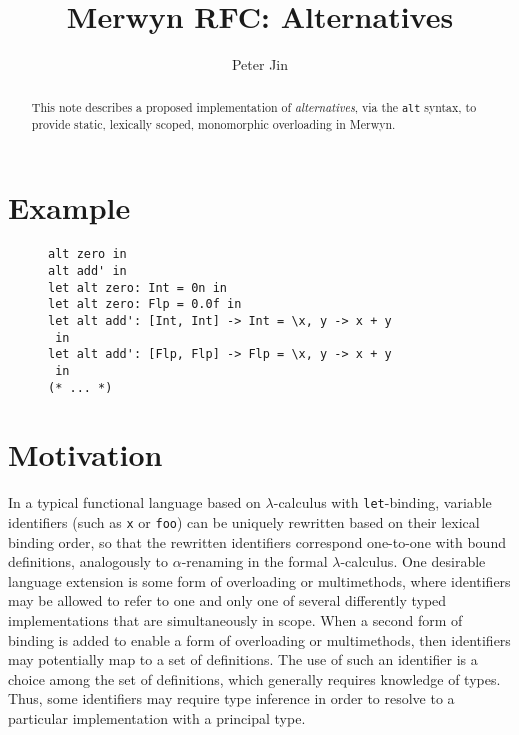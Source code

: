 \documentclass{article}
\title{Merwyn RFC: Alternatives}
\author{Peter Jin}
\renewcommand{\=}{\triangleq}
\begin{document}
\maketitle

\begin{abstract}
This note describes a proposed implementation of \emph{alternatives},
via the \texttt{alt} syntax, to provide static, lexically scoped, monomorphic
overloading in Merwyn.
\end{abstract}

\section{Example}

\begin{figure}[h]
\centering
\begin{varwidth}{\linewidth}
\begin{verbatim}
alt zero in
alt add' in
let alt zero: Int = 0n in
let alt zero: Flp = 0.0f in
let alt add': [Int, Int] -> Int = \x, y -> x + y
 in
let alt add': [Flp, Flp] -> Flp = \x, y -> x + y
 in
(* ... *)
\end{verbatim}
\end{varwidth}
\end{figure}

\section{Motivation}

In a typical functional language based on $\lambda$-calculus with
\texttt{let}-binding,
variable identifiers (such as \texttt{x} or \texttt{foo})
can be uniquely rewritten based on their lexical binding order,
so that the rewritten identifiers correspond one-to-one with bound definitions,
analogously to $\alpha$-renaming in the formal $\lambda$-calculus.
One desirable language extension is some form of overloading or multimethods,
where
identifiers may be allowed to refer to one and only one of several differently
typed implementations that are simultaneously in scope.
When a second form of binding is added to enable a form of overloading or
multimethods,
then identifiers may potentially map to a set of definitions.
The use of such an identifier is a choice among the set of definitions,
which generally requires knowledge of types.
Thus, some identifiers may require type inference in order to resolve to a
particular implementation with a principal type.
\end{document}
